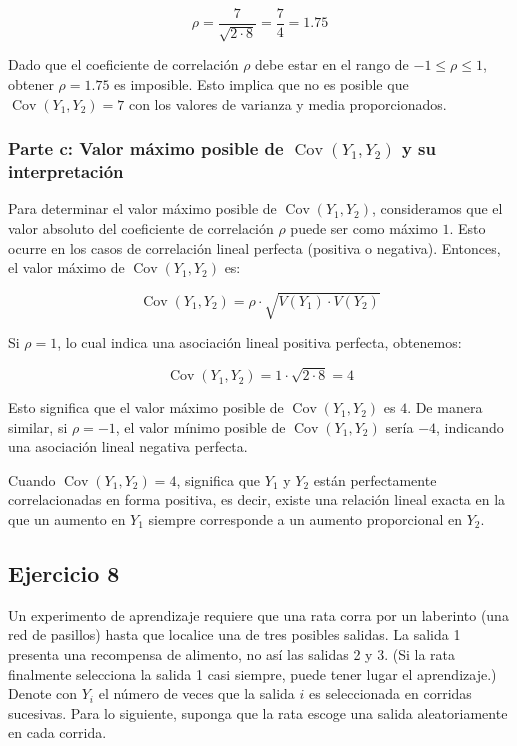 \documentclass[
]{article}
\begin{document}
\[
\rho = \frac{7}{\sqrt{2 \cdot 8}} = \frac{7}{4} = 1.75
\]

Dado que el coeficiente de correlación \(\rho\) debe estar en el rango de \(-1 \leq \rho \leq 1\), obtener \(\rho = 1.75\) es imposible. Esto implica que no es posible que \(\operatorname{Cov}(Y_1, Y_2) = 7\) con los valores de varianza y media proporcionados.

\subsubsection{\texorpdfstring{Parte c: Valor máximo posible de \(\operatorname{Cov}(Y_1, Y_2)\) y su interpretación}{Parte c: Valor máximo posible de \textbackslash operatorname\{Cov\}(Y\_1, Y\_2) y su interpretación}}\label{parte-c-valor-muxe1ximo-posible-de-operatornamecovy_1-y_2-y-su-interpretaciuxf3n}

Para determinar el valor máximo posible de \(\operatorname{Cov}(Y_1, Y_2)\), consideramos que el valor absoluto del coeficiente de correlación \(\rho\) puede ser como máximo \(1\). Esto ocurre en los casos de correlación lineal perfecta (positiva o negativa). Entonces, el valor máximo de \(\operatorname{Cov}(Y_1, Y_2)\) es:

\[
\operatorname{Cov}(Y_1, Y_2) = \rho \cdot \sqrt{V(Y_1) \cdot V(Y_2)} 
\]

Si \(\rho = 1\), lo cual indica una asociación lineal positiva perfecta, obtenemos:

\[
\operatorname{Cov}(Y_1, Y_2) = 1 \cdot \sqrt{2 \cdot 8} = 4
\]

Esto significa que el valor máximo posible de \(\operatorname{Cov}(Y_1, Y_2)\) es \(4\). De manera similar, si \(\rho = -1\), el valor mínimo posible de \(\operatorname{Cov}(Y_1, Y_2)\) sería \(-4\), indicando una asociación lineal negativa perfecta.

Cuando \(\operatorname{Cov}(Y_1, Y_2) = 4\), significa que \(Y_1\) y \(Y_2\) están perfectamente correlacionadas en forma positiva, es decir, existe una relación lineal exacta en la que un aumento en \(Y_1\) siempre corresponde a un aumento proporcional en \(Y_2\).

\subsection{Ejercicio 8}\label{ejercicio-8}

Un experimento de aprendizaje requiere que una rata corra por un laberinto (una red de pasillos) hasta que localice una de tres posibles salidas. La salida 1 presenta una recompensa de alimento, no así las salidas 2 y 3. (Si la rata finalmente selecciona la salida 1 casi siempre, puede tener lugar el aprendizaje.) Denote con \(Y_{i}\) el número de veces que la salida \(i\) es seleccionada en corridas sucesivas. Para lo siguiente, suponga que la rata escoge una salida aleatoriamente en cada corrida.
\end{document}
